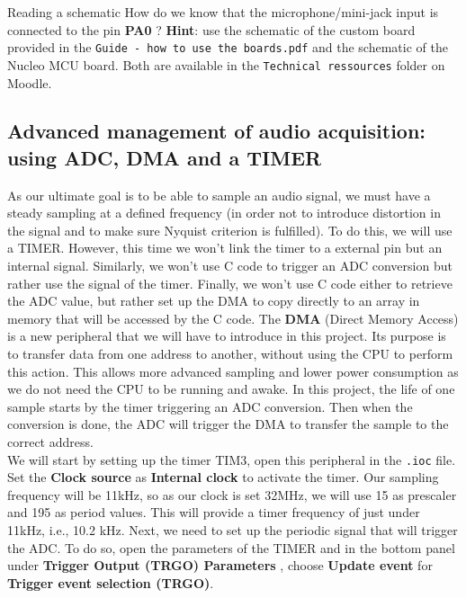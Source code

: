 \begin{bclogo}[couleur = gray!20, arrondi = 0.2, logo=\bcquestion]{Reading a schematic}
How do we know that the microphone/mini-jack input is connected to the pin \textbf{PA0} ? \textbf{Hint}: use the schematic of the custom board provided in the \texttt{Guide - how to use the boards.pdf} and the schematic of the Nucleo MCU board. Both are available in the \texttt{Technical ressources} folder on Moodle.
\end{bclogo}


\subsection{Advanced management of audio acquisition: using ADC, DMA and a TIMER}

\noindent As our ultimate goal is to be able to sample an audio signal, we must have a steady sampling at a defined frequency (in order not to introduce distortion in the signal and to make sure Nyquist criterion is fulfilled). To do this, we will use a TIMER. However, this time we won't link the timer to a external pin but an internal signal. Similarly, we won't use C code to trigger an ADC conversion but rather use the signal of the timer. Finally, we won't use C code either to retrieve the ADC value, but rather set up the DMA to copy directly to an array in memory that will be accessed by the C code. The \textbf{DMA} (Direct Memory Access) is a new peripheral that we will have to introduce in this project. Its purpose is to transfer data from one address to another, without using the CPU to perform this action. This allows more advanced sampling and lower power consumption as we do not need the CPU to be running and awake. In this project, the life of one sample starts by the timer triggering an ADC conversion. Then when the conversion is done, the ADC will trigger the DMA to transfer the sample to the correct address. \\

\noindent We will start by setting up the timer TIM3, open this peripheral in the \texttt{.ioc} file. Set the \textbf{Clock source} as \textbf{Internal clock} to activate the timer. Our sampling frequency will be 11kHz, so as our clock is set 32MHz, we will use 15 as prescaler and 195 as period values. This will provide a timer frequency of just under 11kHz, i.e., 10.2 kHz. Next, we need to set up the periodic signal that will trigger the ADC. To do so, open the parameters of the TIMER and in the bottom panel under \textbf{Trigger Output (TRGO) Parameters} , choose \textbf{Update event} for \textbf{Trigger event selection (TRGO)}. \\


